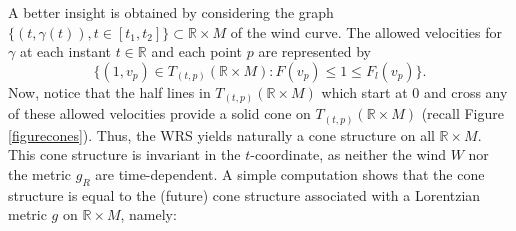 \documentclass[reqno,10pt]{amsart}
\newcommand{\R}{\mathds R}
\begin{document}
A better insight is obtained by considering the graph $\{(t,\gamma(t)), t\in [t_1,t_2]\}\subset \R\times M$ of the wind curve. %
The allowed velocities for $\gamma$ at each instant $t\in\R$ and each point $p$  are represented by 
\begin{equation}\label{windgraph}
\{(1,v_p)\in T_{(t,p)}(\R\times M): F(v_p) \leq 1 \leq 
F_l(v_p)\}.
\end{equation}
Now, notice that the half lines in $T_{(t,p)}(\R\times M)$ which start at $0$ and cross any of these allowed velocities provide a solid cone on  
$T_{(t,p)}(\R\times M)$  (recall Figure \ref{figurecones}).  Thus, the WRS yields naturally a cone structure on all $\R\times M$. This cone structure is invariant in the $t$-coordinate, as neither the wind  $W$  nor the  metric $g_R$ are time-dependent. A simple computation shows that the cone structure is equal to the (future) cone structure associated with a Lorentzian metric $g$ on $\R \times M$, namely:
\end{document}

